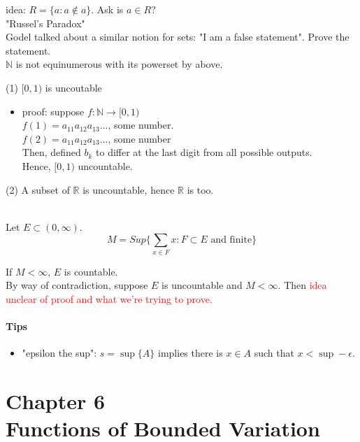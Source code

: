 \documentclass[12pt]{article}
\begin{document}
{idea: $R = \{a : a \not \in a\}$. Ask is $a \in R$? \\
"Russel's Paradox" \\

Godel talked about a similar notion for sets: "I am a false statement".
Prove the statement.\\

\textcolor[gray]{0.5}{$\mathbb{N}$ is not equinumerous with its powerset by above}.


\textcolor[gray]{0.5}{
(1) $[0, 1)$ is uncoutable 
\begin{itemize}
\item[]
    proof: suppose $f : \mathbb{N} \rightarrow [0, 1)$ \\
    $f(1) = a_{11} a_{12} a_{13} ...$, some number.\\
    $f(2) = a_{11} a_{12} a_{13} ...$, some number\\
    Then, defined $b_k$ to differ at the last digit from all possible outputs.\\
    Hence, $[0, 1)$ uncountable.
\end{itemize}
(2) A subset of $\mathbb{R}$ is uncountable, hence $\mathbb{R}$ is too.
}
\ \\

Let $E \subset (0, \infty)$. 
$$M = Sup \{ \sum_{x \in F} x : F \subset E \text{ and finite} \}$$

If $M < \infty$, $E$ is countable.\\
\textcolor[gray]{0.5}{By way of contradiction, suppose $E$ is uncountable and $M < \infty$.
Then
\textcolor{red}{idea unclear of proof and what we're trying to prove.}
}

\subsection*{Tips}
\begin{itemize}
    \item "epsilon the sup": $s = \sup \{A\}$ implies there is $x \in A$ such that $x < \sup - \epsilon$.
\end{itemize}


\part*{Chapter 6\\ Functions of Bounded Variation}

}
\end{document}
